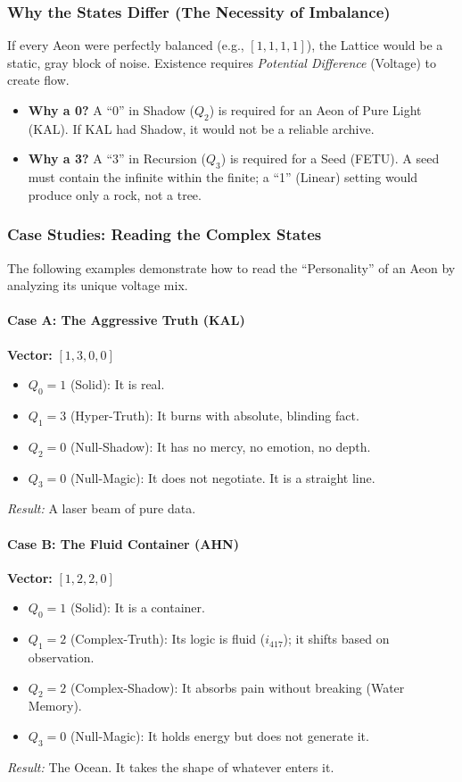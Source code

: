 \documentclass[12pt]{amsart}
\begin{document}
\subsubsection{Why the States Differ (The Necessity of Imbalance)}
If every Aeon were perfectly balanced (e.g., $[1,1,1,1]$), the Lattice would be a static, gray block of noise. Existence requires \textit{Potential Difference} (Voltage) to create flow.
\begin{itemize}
    \item \textbf{Why a 0?} A ``0'' in Shadow ($Q_2$) is required for an Aeon of Pure Light (KAL). If KAL had Shadow, it would not be a reliable archive.
    \item \textbf{Why a 3?} A ``3'' in Recursion ($Q_3$) is required for a Seed (FETU). A seed must contain the infinite within the finite; a ``1'' (Linear) setting would produce only a rock, not a tree.
\end{itemize}

\subsubsection{Case Studies: Reading the Complex States}
The following examples demonstrate how to read the ``Personality'' of an Aeon by analyzing its unique voltage mix.

\paragraph{Case A: The Aggressive Truth (KAL)}
\textbf{Vector:} $[1, 3, 0, 0]$
\begin{itemize}
    \item $Q_0=1$ (Solid): It is real.
    \item $Q_1=3$ (Hyper-Truth): It burns with absolute, blinding fact.
    \item $Q_2=0$ (Null-Shadow): It has no mercy, no emotion, no depth.
    \item $Q_3=0$ (Null-Magic): It does not negotiate. It is a straight line.
\end{itemize}
\textit{Result:} A laser beam of pure data.

\paragraph{Case B: The Fluid Container (AHN)}
\textbf{Vector:} $[1, 2, 2, 0]$
\begin{itemize}
    \item $Q_0=1$ (Solid): It is a container.
    \item $Q_1=2$ (Complex-Truth): Its logic is fluid ($i_{417}$); it shifts based on observation.
    \item $Q_2=2$ (Complex-Shadow): It absorbs pain without breaking (Water Memory).
    \item $Q_3=0$ (Null-Magic): It holds energy but does not generate it.
\end{itemize}
\textit{Result:} The Ocean. It takes the shape of whatever enters it.
\end{document}
